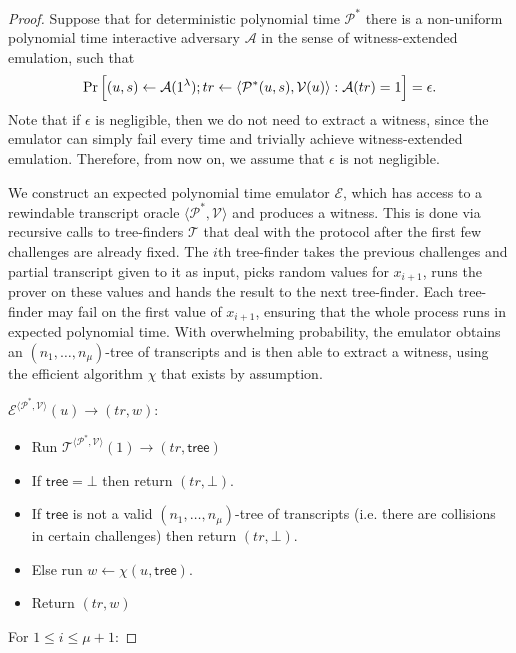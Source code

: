 \begin{proof}\label{forkproof}
Suppose that for deterministic polynomial time $\mathcal{P}^*$ there is a non-uniform polynomial time interactive adversary $\mathcal{A}$ in the sense of witness-extended emulation, such that
$$ \Pr \Big{[}(u,s) \leftarrow\mathcal{A}(1^{\lambda}); tr \leftarrow \langle \mathcal{P}^*(u,s), \mathcal{V}(u)\rangle: \mathcal{A}(tr)=1\Big{]} = \epsilon.$$
Note that if $\epsilon$ is negligible, then we do not need to extract a witness, since the emulator can simply fail every time and trivially achieve witness-extended emulation. Therefore, from now on, we assume that $\epsilon$ is not negligible.

We construct an expected polynomial time emulator $\mathcal{E}$, which has access to a rewindable transcript oracle $\langle \mathcal{P}^*, \mathcal{V}\rangle$ and produces a witness. This is done via recursive calls to tree-finders $\mathcal{T}$ that deal with the protocol after the first few challenges are already fixed. The $i$th tree-finder takes the previous challenges and partial transcript given to it as input, picks random values for $x_{i+1}$, runs the prover on these values and hands the result to the next tree-finder. Each tree-finder may fail on the first value of $x_{i+1}$, ensuring that the whole process runs in expected polynomial time. With overwhelming probability, the emulator obtains an $(n_1,\ldots,n_\mu)$-tree of transcripts and is then able to extract a witness, using the efficient algorithm $\chi$ that exists by assumption.

\begin{description}
\item $\mathcal{E}^{\langle \mathcal{P}^*, \mathcal{V}\rangle}(u)\to (tr,w)$:
\begin{itemize}
\item Run $\mathcal{T}^{\langle \mathcal{P}^*, \mathcal{V}\rangle}(1) \to (tr,\mathsf{tree})$
\item If $\mathsf{tree}=\bot$ then return $(tr,\bot)$.
\item If $\mathsf{tree}$ is not a valid $(n_1,\ldots,n_\mu)$-tree of transcripts (i.e. there are collisions in certain challenges) then return $(tr,\bot)$.
\item Else run $w \gets \chi(u,\mathsf{tree})$.
\item Return $(tr,w)$
\end{itemize}
\end{description}
For $1 \leq i \leq \mu+1$:


\end{proof}
